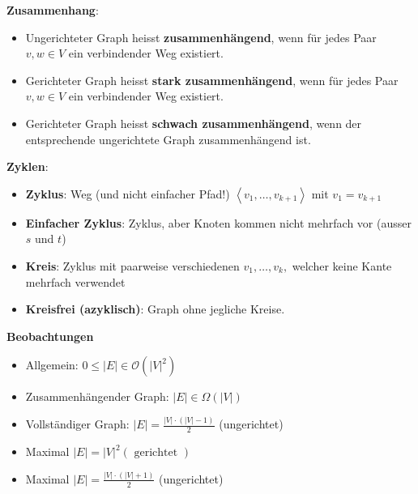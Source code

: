 \vspace{-4pt}
\begin{sectionbox}
\textbf{Zusammenhang}:\par
\begin{itemize}
    \item Ungerichteter Graph heisst \textbf{zusammenhängend}, wenn für jedes Paar $v, w \in V$ ein verbindender Weg existiert.
    \item Gerichteter Graph heisst \textbf{stark zusammenhängend}, wenn für jedes Paar $v, w \in V$ ein verbindender Weg existiert.
    \item Gerichteter Graph heisst \textbf{schwach zusammenhängend}, wenn der entsprechende ungerichtete Graph zusammenhängend ist.
\end{itemize}\par\smallskip

\end{sectionbox}
\vspace{-4pt}
\begin{sectionbox}
\textbf{Zyklen}:\par
\begin{itemize}
    \item \textbf{Zyklus}: Weg (und nicht einfacher Pfad!) $\left\langle v_{1}, \ldots, v_{k+1}\right\rangle$ mit $v_{1}=v_{k+1}$
    \item \textbf{Einfacher Zyklus}: Zyklus, aber Knoten kommen nicht mehrfach vor (ausser $s$ und $t$)
    \item \textbf{Kreis}: Zyklus mit paarweise verschiedenen $v_{1}, \ldots, v_{k},$ welcher keine Kante mehrfach verwendet
    \item \textbf{Kreisfrei (azyklisch)}: Graph ohne jegliche Kreise.
\end{itemize}\par\vspace{7px}

\end{sectionbox}
\vspace{-4pt}
\begin{sectionbox}
\textbf{Beobachtungen}\par
\begin{itemize}
    \item Allgemein: $0 \leq|E| \in \mathcal{O}\left(|V|^{2}\right)$
    \item Zusammenhängender Graph: $|E| \in \Omega(|V|)$
    \item Vollständiger Graph: $|E|=\frac{|V| \cdot(|V|-1)}{2}$ (ungerichtet)
    \item Maximal $|E|=|V|^{2}(\text { gerichtet })$
    \item Maximal $|E|=\frac{|V| \cdot(|V|+1)}{2}$ (ungerichtet)
\end{itemize}\par\smallskip
\end{sectionbox}

